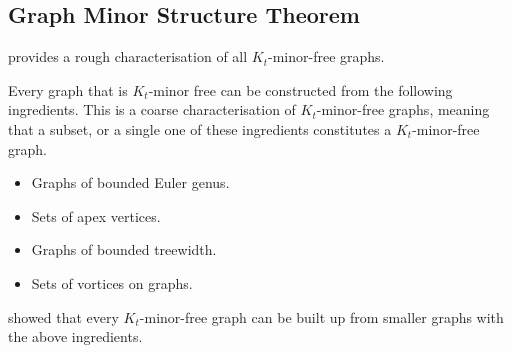 \subsection{Graph Minor Structure Theorem}
\textcite{robertsonGraphMinorsXVII1999} provides a rough characterisation of all \(K_t\)-minor-free graphs. 

Every graph that is $K_t$-minor free can be constructed from the following ingredients. This is a coarse characterisation of $K_t$-minor-free graphs, meaning that a subset, or a single one of these ingredients constitutes a $K_t$-minor-free graph. 
\begin{itemize}
	\item Graphs of bounded Euler genus.
	\item Sets of apex vertices.
	\item Graphs of bounded treewidth.
	\item Sets of vortices on graphs.
\end{itemize}
\textcite{robertsonGraphMinorsXVII1999} showed that every \(K_t\)-minor-free graph can be built up from smaller graphs with the above ingredients.
